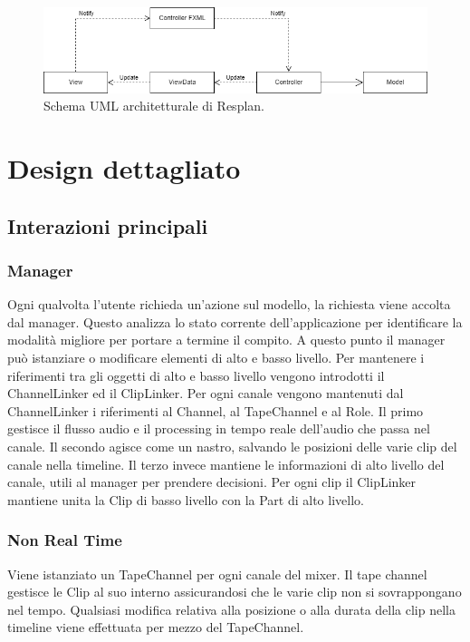 \documentclass[a4paper,12pt]{report}
\begin{document}
\begin{figure}[h]
\centering{}
\includegraphics[width=\textwidth]{img/arch.png}
\caption{Schema UML architetturale di Resplan.}
\end{figure}

\section{Design dettagliato}

\subsection{Interazioni principali}
\subsubsection{Manager}
Ogni qualvolta l’utente richieda un’azione sul modello, la richiesta viene accolta dal manager. Questo analizza lo stato corrente dell’applicazione per identificare la modalità migliore per portare a termine il compito. A questo punto il manager può istanziare o modificare elementi di alto e basso livello.
Per mantenere i riferimenti tra gli oggetti di alto e basso livello vengono introdotti il ChannelLinker ed il ClipLinker. 
Per ogni canale vengono mantenuti dal ChannelLinker i riferimenti al Channel, al TapeChannel e al Role.
Il primo gestisce il flusso audio e il processing in tempo reale dell’audio che passa nel canale. Il secondo agisce come un nastro, salvando le posizioni delle varie clip del canale nella timeline. Il terzo invece mantiene le informazioni di alto livello del canale, utili al manager per prendere decisioni.
Per ogni clip il ClipLinker mantiene unita la Clip di basso livello con la Part di alto livello.

\subsubsection{Non Real Time}
Viene istanziato un TapeChannel per ogni canale del mixer. Il tape channel gestisce le Clip al suo interno assicurandosi che le varie clip non si sovrappongano nel tempo. Qualsiasi modifica relativa alla posizione o alla durata della clip nella timeline viene effettuata per mezzo del TapeChannel.
\end{document}
